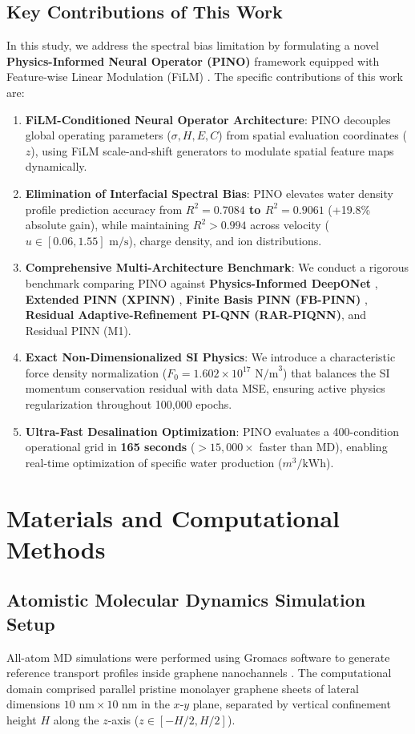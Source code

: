 \documentclass[3p,preprint,12pt,numbers,square,sort&compress]{elsarticle}
\begin{document}
\subsection{Key Contributions of This Work}
In this study, we address the spectral bias limitation by formulating a novel \textbf{Physics-Informed Neural Operator (PINO)} framework equipped with Feature-wise Linear Modulation (FiLM) \cite{perez2018}. The specific contributions of this work are:
\begin{enumerate}
    \item \textbf{FiLM-Conditioned Neural Operator Architecture}: PINO decouples global operating parameters ($\sigma, H, E, C$) from spatial evaluation coordinates ($z$), using FiLM scale-and-shift generators to modulate spatial feature maps dynamically.
    \item \textbf{Elimination of Interfacial Spectral Bias}: PINO elevates water density profile prediction accuracy from \textbf{$R^2 = 0.7084$ to $R^2 = 0.9061$} (+19.8\% absolute gain), while maintaining $R^2 > 0.994$ across velocity ($u \in [0.06, 1.55]\text{ m/s}$), charge density, and ion distributions.
    \item \textbf{Comprehensive Multi-Architecture Benchmark}: We conduct a rigorous benchmark comparing PINO against \textbf{Physics-Informed DeepONet} \cite{lu2021}, \textbf{Extended PINN (XPINN)} \cite{jagtap2020}, \textbf{Finite Basis PINN (FB-PINN)} \cite{moseley2023}, \textbf{Residual Adaptive-Refinement PI-QNN (RAR-PIQNN)}, and Residual PINN (M1).
    \item \textbf{Exact Non-Dimensionalized SI Physics}: We introduce a characteristic force density normalization ($F_0 = 1.602 \times 10^{17}\text{ N/m}^3$) that balances the SI momentum conservation residual with data MSE, ensuring active physics regularization throughout 100,000 epochs.
    \item \textbf{Ultra-Fast Desalination Optimization}: PINO evaluates a 400-condition operational grid in \textbf{165 seconds} ($>15,000\times$ faster than MD), enabling real-time optimization of specific water production ($m^3/\text{kWh}$).
\end{enumerate}

\section{Materials and Computational Methods}

\subsection{Atomistic Molecular Dynamics Simulation Setup}
All-atom MD simulations were performed using Gromacs software to generate reference transport profiles inside graphene nanochannels \cite{arya2026}. The computational domain comprised parallel pristine monolayer graphene sheets of lateral dimensions $10\text{ nm} \times 10\text{ nm}$ in the $x$-$y$ plane, separated by vertical confinement height $H$ along the $z$-axis ($z \in [-H/2, H/2]$).
\end{document}

